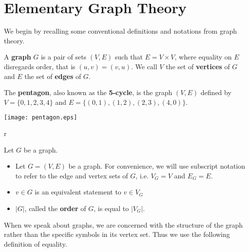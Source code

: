 \section{Elementary Graph Theory}




We begin by recalling some conventional definitions and notations from graph
theory.

\begin{definition}
  A \textbf{graph} $G$ is a pair of sets $(V,E)$ such that $E = V \times V$,
  where equality on $E$ disregards order, that is $(u,v) = (v,u)$. We call $V$
  the set of \textbf{vertices} of $G$ and $E$ the set of \textbf{edges} of $G$.
\end{definition}

\begin{example}
  The \textbf{pentagon}, also known as the \textbf{5-cycle}, is the graph
  $(V,E)$ defined by $V = \{0,1,2,3,4\}$ and $E = \{(0,1),(1,2),(2,3),(4,0)\}$.

  \texttt{[image: pentagon.eps]}
  \begin{wrapfigure}{r}{\textwidth}
    \caption{}

  \end{wrapfigure}
\end{example}

\begin{remark}[Notation]
  Let $G$ be a graph.

  \begin{itemize}
  \item Let $G = (V,E)$ be a graph. For convenience, we will use subscript
    notation to refer to the edge and vertex sets of $G$, i.e. $V_G = V$ and
    $E_G = E$.
  \item $v \in G$ is an equivalent statement to $v \in V_G$
  \item $|G|$, called the \textbf{order} of $G$, is equal to $|V_G|$.
  \end{itemize}
\end{remark}

When we speak about graphs, we are concerned with the structure of the graph
rather than the specific symbols in its vertex set. Thus we use the following
definition of equality.

